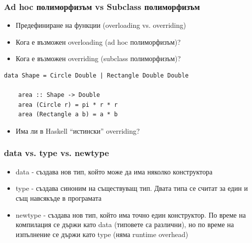 \documentclass{beamer}
\begin{document}
\begin{frame}[fragile]
\frametitle{Ad hoc полиморфизъм vs Subclass полиморфизъм}


\begin{itemize}
  \item Предефиниране на функции (overloading vs. overriding)
  \item Кога е възможен overloading (ad hoc полиморфизъм)?
  \item Кога е възможен overriding (subclass полиморфизъм)?
\end{itemize}

  \begin{lstlisting}[basicstyle=\small]
    data Shape = Circle Double | Rectangle Double Double

    area :: Shape -> Double
    area (Circle r) = pi * r * r
    area (Rectangle a b) = a * b
  \end{lstlisting}

\begin{itemize}
  \item Има ли в Haskell ``истински'' overriding?
\end{itemize}

\end{frame}

\begin{frame}[fragile]
\frametitle{data vs. type vs. newtype}
\begin{itemize}
  \item data - създава нов тип, който може да има няколко конструктора
  \item type - създава синоним на съществуващ тип. Двата типа се считат за един и същ навсякъде в програмата
  \item newtype - създава нов тип, който има точно един конструктор. По време на компилация се държи като data (типовете са различни), но по време на изпълнение се държи като type (няма runtime overhead)
\end{itemize}
\end{frame}
\end{document}
